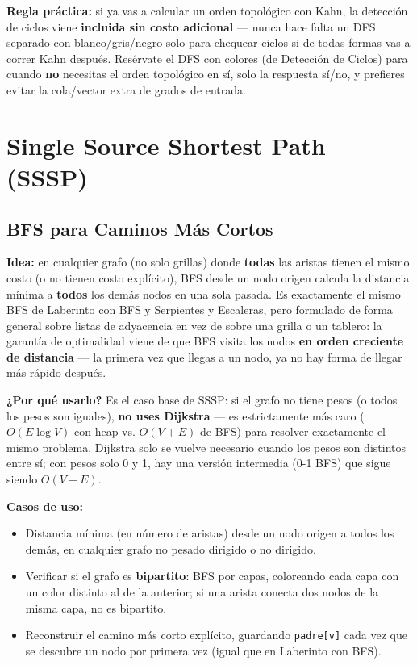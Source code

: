 \documentclass[10pt,a4paper,twocolumn]{article}
\begin{document}
\textbf{Regla práctica:} si ya vas a calcular un orden topológico con
Kahn, la detección de ciclos viene \textbf{incluida sin costo
	adicional} — nunca hace falta un DFS separado con
blanco/gris/negro solo para chequear ciclos si de todas formas vas a
correr Kahn después. Resérvate el DFS con colores (de Detección de
Ciclos) para cuando \textbf{no} necesitas el orden topológico en sí,
solo la respuesta sí/no, y prefieres evitar la cola/vector extra de
grados de entrada.


\section{Single Source Shortest Path (SSSP)}
\subsection{BFS para Caminos Más Cortos}

\textbf{Idea:} en cualquier grafo (no solo grillas) donde
\textbf{todas} las aristas tienen el mismo costo (o no tienen costo
explícito), BFS desde un nodo origen calcula la distancia mínima a
\textbf{todos} los demás nodos en una sola pasada. Es exactamente el
mismo BFS de Laberinto con BFS y Serpientes y Escaleras, pero
formulado de forma general sobre listas de adyacencia en vez de sobre
una grilla o un tablero: la garantía de optimalidad viene de que BFS
visita los nodos \textbf{en orden creciente de distancia} — la
primera vez que llegas a un nodo, ya no hay forma de llegar más
rápido después.

\textbf{¿Por qué usarlo?} Es el caso base de SSSP: si el grafo no
tiene pesos (o todos los pesos son iguales), \textbf{no uses
	Dijkstra} — es estrictamente más caro ($O(E \log V)$ con heap vs.
$O(V+E)$ de BFS) para resolver exactamente el mismo problema. Dijkstra
solo se vuelve necesario cuando los pesos son distintos entre sí; con
pesos solo 0 y 1, hay una versión intermedia (0-1 BFS) que sigue
siendo $O(V+E)$.

\textbf{Casos de uso:}

\begin{itemize}
	\item Distancia mínima (en número de aristas) desde un nodo
	origen a todos los demás, en cualquier grafo no pesado dirigido
	o no dirigido.
	\item Verificar si el grafo es \textbf{bipartito}: BFS por capas,
	coloreando cada capa con un color distinto al de la anterior; si
	una arista conecta dos nodos de la misma capa, no es bipartito.
	\item Reconstruir el camino más corto explícito, guardando
	\texttt{padre[v]} cada vez que se descubre un nodo por primera
	vez (igual que en Laberinto con BFS).
\end{itemize}
\end{document}
